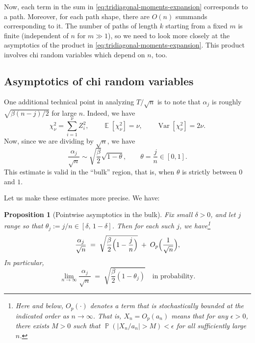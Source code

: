 \documentclass[letterpaper,11pt,oneside,reqno]{article}
\numberwithin{equation}{section}
\newtheorem{proposition}{Proposition}[section]
\theoremstyle{definition}
\begin{document}
Now, each term in the sum in \eqref{eq:tridiagonal-moments-expansion}
corresponds to a path. Moreover, for each path shape,
there are $O(n)$ summands corresponding to it. The number of
paths of length $k$ starting from a fixed $m$
is finite (independent of $n$ for $m\gg 1$),
so we need to look more closely at the asymptotics of the product
in \eqref{eq:tridiagonal-moments-expansion}. This product
involves chi random variables which depend on $n$, too.

\subsection{Asymptotics of chi random variables}
\label{sub:chi-asymptotics}

One additional technical point in analyzing $T/\sqrt{n}$ is to note that $\alpha_j$
is roughly $\sqrt{\beta(n-j)/2}$ for large $n$.
Indeed, we have
\begin{equation*}
	\chi^2_\nu=\sum_{i=1}^\nu Z_i^2,\qquad
	\operatorname{\mathbb{E}}[\chi^2_\nu]=\nu,\qquad
	\operatorname{Var}[\chi^2_\nu]=2\nu.
\end{equation*}
Now, since we are dividing by $\sqrt n$, we have
\begin{equation*}
	\frac{\alpha_j}{\sqrt n}\sim \sqrt{\frac{\beta}{2}}\sqrt{1-\theta},\qquad
	\theta=\frac{j}{n}\in [0,1].
\end{equation*}
This estimate is valid in the ``bulk'' region, that is, when $\theta$ is strictly between $0$ and $1$.

Let us make these estimates more precise.  We have:
\begin{proposition}[Pointwise asymptotics in the bulk]
\label{prop:alpha-bulk}
Fix small $\delta>0$, and let $j$ range so that $\theta_j := j/n \in [\delta,\, 1-\delta]$.
Then for each such $j$, we have\footnote{Here and below, $O_p(\cdot)$ denotes a term that is stochastically bounded at the indicated order as $n\to\infty$. That is, $X_n = O_p(a_n)$ means that for any $\epsilon>0$, there exists $M>0$ such that $\operatorname{\mathbb{P}}(|X_n/a_n| > M) < \epsilon$ for all sufficiently large $n$.}
\[
  \frac{\alpha_j}{\sqrt{n}}
	\;=\; \sqrt{\frac{\beta}{2}\Bigl(1 - \frac{j}{n}\Bigr)}
  \;+\; O_p\Bigl(\frac{1}{\sqrt{n}}\Bigr),
\]
In particular,
\[
  \lim_{n\to\infty} \frac{\alpha_j}{\sqrt{n}}
	\;=\; \sqrt{\frac{\beta}{2}(1-\theta_j)}
  \quad\text{in probability.}
\]
\end{proposition}
\end{document}
